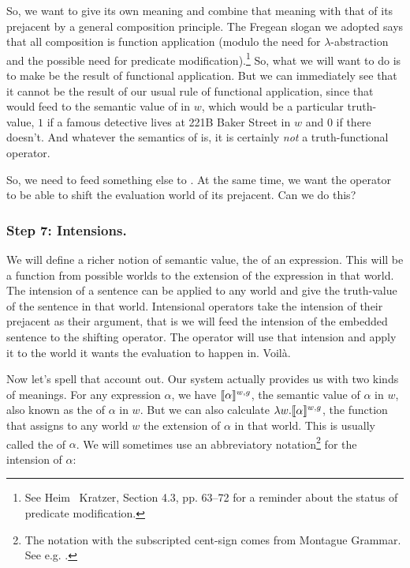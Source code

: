 So, we want to give  its own meaning and combine that meaning with that of its prejacent by a general composition principle. The Fregean slogan we adopted says that all composition is function application (modulo the need for $\lambda$-abstraction and the possible need for predicate modification).\footnote{See Heim \amp\ Kratzer, Section 4.3, pp. 63--72 for a reminder about the status of predicate modification.} So, what we will want to do is to make \LLast be the result of functional application. But we can immediately see that it cannot be the result of our usual rule of functional application, since that would feed to  the semantic value of  in $w$, which would be a particular truth-value, $1$ if a famous detective lives at 221B Baker Street in $w$ and $0$ if there doesn't. And whatever the semantics of  is, it is certainly \emph{not} a truth-functional operator. 

So, we need to feed something else to . At the same time, we want the operator to be able to shift the evaluation world of its prejacent. Can we do this?

\subsubsection{Step 7: Intensions.} \label{sec:intensions}

We will define a richer notion of semantic value, the  of an expression. This will be a function from possible worlds to the extension of the expression in that world. The intension of a sentence can be applied to any world and give the truth-value of the sentence in that world. Intensional operators take the intension of their prejacent as their argument, that is we will feed the intension of the embedded sentence to the shifting operator. The operator will use that intension and apply it to the world it wants the evaluation to happen in. Voilà. 

Now let's spell that account out. Our system actually provides us with two kinds of meanings. For any expression $\alpha$, we have $\llbracket \alpha \rrbracket^{w,g}$, the semantic value of $\alpha$ in $w$, also known as the  of $\alpha$ in $w$. But we can also calculate $\lambda w. \llbracket \alpha \rrbracket^{w,g}$, the function that assigns to any world $w$ the extension of $\alpha$ in that world. This is usually called the  of $\alpha$. We will sometimes use an abbreviatory notation\footnote{The notation with the subscripted cent-sign comes from Montague Grammar. See e.g. \citet[147]{dowty-wall-peters:1981:intro}.} for the intension of $\alpha$:

